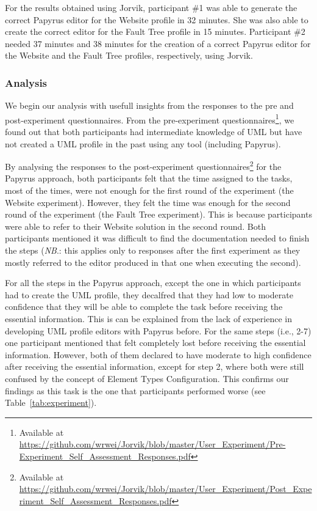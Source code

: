 For the results obtained using Jorvik, participant \#1 was able to generate the correct Papyrus editor for the Website profile in 32 minutes. She was also able to create the correct editor for the Fault Tree profile in 15 minutes.
Participant \#2 needed 37 minutes and 38 minutes for the creation of a correct Papyrus editor for the Website and the Fault Tree profiles, respectively, using Jorvik.


\subsubsection{Analysis} 
We begin our analysis with usefull insights from the responses to the pre and post-experiment questionnaires.
From the pre-experiment questionnaires\footnote{Available at \url{https://github.com/wrwei/Jorvik/blob/master/User_Experiment/Pre-Experiment_Self_Assessment_Responses.pdf}}, we found out that both participants had intermediate knowledge of UML but have not created a UML profile in the past using any tool (including Papyrus).

By analysing the responses to the post-experiment questionnaires\footnote{Available at \url{https://github.com/wrwei/Jorvik/blob/master/User_Experiment/Post_Experiment_Self_Assessment_Responses.pdf}} for the Papyrus approach,
both participants felt that the time assigned to the tasks, most of the times, were not enough for the first round of the experiment (the Website experiment). However, they felt the time was enough for the second round of the experiment (the Fault Tree experiment). This is because participants were able to refer to their Website solution in the second round. Both participants mentioned it was difficult to find the documentation needed to finish the steps (\textit{NB}.: this applies only to responses after the first experiment as they mostly referred to the editor produced in that one when executing the second).

For all the steps in the Papyrus approach, except the one in which participants had to create the UML profile, they decalfred that they had low to moderate confidence that they will be able to complete the task before receiving the essential information. This is can be explained from the lack of experience in developing UML profile editors with Papyrus before. For the same steps (i.e., 2-7) one participant mentioned that felt completely lost before receiving the essential information. However, both of them declared to have moderate to high confidence after receiving the essential information, except for step 2, where both were still confused by the concept of Element Types Configuration. This confirms our findings as this task is the one that participants performed worse (see Table~\ref{tab:experiment}). 
	
